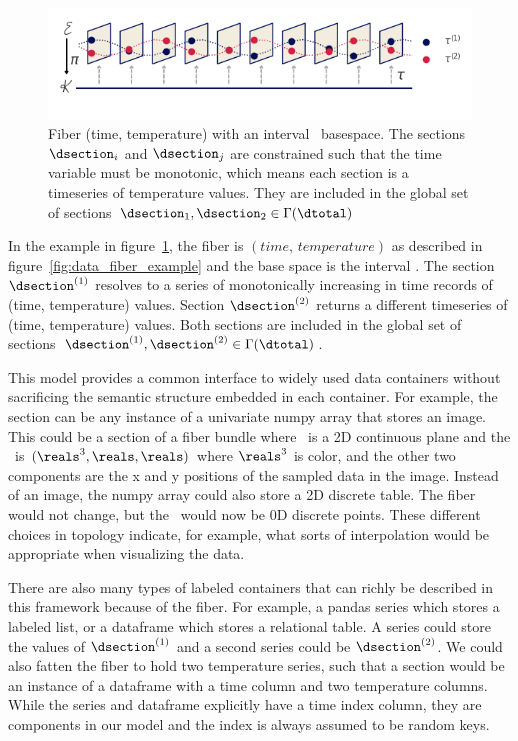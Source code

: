 \documentclass[../main.tex]{subfiles}
\begin{document}
\begin{figure}[H]
    \includegraphics[width=1\linewidth]{figures/math/fiberbundle.png}
    \caption{ Fiber (time, temperature) with an interval \dbase\ basespace. The sections $\dsection_i$ and $\dsection_j$ are constrained such that the time variable must be monotonic, which means each section is a timeseries of temperature values. They are included in the global set of sections  $\dsection_1, \dsection_2 \in \Gamma(\dtotal)$}
    \label{fig:data_sections}
\end{figure}

In the example in figure~\ref{fig:data_sections}, the fiber is $(time, \, temperature)$ as described in figure~\ref{fig:data_fiber_example} and the base space is the interval \dbase. The section $\dsection^{(1)}$ resolves to a series of monotonically increasing in time records of (time, temperature) values. Section $\dsection^{(2)}$ returns a different timeseries of (time, temperature) values. Both sections are included in the global set of sections $\dsection^{(1)}, \dsection^{(2)} \in \Gamma(\dtotal)$.


This model provides a common interface to widely used data containers without sacrificing the semantic structure embedded in each container. For example, the section can be any instance of a univariate numpy array\cite{harris2020array} that stores an image. This could be a section of a fiber bundle where \dbase\ is a 2D continuous plane and the \dfiber\ is $(\reals^{3}, \reals, \reals)$ where $\reals^3$ is color, and the other two components are the x and y positions of the sampled data in the image. Instead of an image, the numpy array could also store a 2D discrete table. The fiber would not change, but the \dbase\ would now be 0D discrete points. These different choices in topology indicate, for example, what sorts of interpolation would be appropriate when visualizing the data. 

There are also many types of labeled containers that can richly be described in this framework because of the fiber. For example, a pandas series which stores a labeled list, or a dataframe\cite{jeff_reback_2020_3715232} which stores a relational table. A series could store the values of $\dsection^{(1)}$ and a second series could be  $\dsection^{(2)}$. We could also fatten the fiber to hold two temperature series, such that a section would be an instance of a dataframe with a time column and two temperature columns. While the series and dataframe explicitly have a time index column, they are components in our model and the index is always assumed to be random keys.
\end{document}
